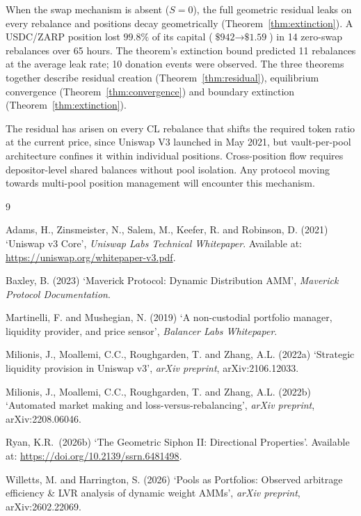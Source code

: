 \documentclass[11pt,a4paper]{article}
\begin{document}
When the swap mechanism is absent ($S = 0$), the full geometric residual leaks on every rebalance and positions decay geometrically (Theorem~\ref{thm:extinction}). A USDC/ZARP position lost $99.8\%$ of its capital ($\text{\$942} \to \text{\$1.59}$) in 14 zero-swap rebalances over 65 hours. The theorem's extinction bound predicted 11 rebalances at the average leak rate; 10 donation events were observed. The three theorems together describe residual creation (Theorem~\ref{thm:residual}), equilibrium convergence (Theorem~\ref{thm:convergence}) and boundary extinction (Theorem~\ref{thm:extinction}).

The residual has arisen on every CL rebalance that shifts the required token ratio at the current price, since Uniswap V3 launched in May 2021, but vault-per-pool architecture confines it within individual positions. Cross-position flow requires depositor-level shared balances without pool isolation. Any protocol moving towards multi-pool position management will encounter this mechanism.

\begin{thebibliography}{9}

Adams, H., Zinsmeister, N., Salem, M., Keefer, R. and Robinson, D. (2021) `Uniswap v3 Core', \emph{Uniswap Labs Technical Whitepaper}. Available at: \url{https://uniswap.org/whitepaper-v3.pdf}.

Baxley, B. (2023) `Maverick Protocol: Dynamic Distribution AMM', \emph{Maverick Protocol Documentation}.

Martinelli, F. and Mushegian, N. (2019) `A non-custodial portfolio manager, liquidity provider, and price sensor', \emph{Balancer Labs Whitepaper}.

Milionis, J., Moallemi, C.C., Roughgarden, T. and Zhang, A.L. (2022a) `Strategic liquidity provision in Uniswap v3', \emph{arXiv preprint}, arXiv:2106.12033.

Milionis, J., Moallemi, C.C., Roughgarden, T. and Zhang, A.L. (2022b) `Automated market making and loss-versus-rebalancing', \emph{arXiv preprint}, arXiv:2208.06046.

Ryan, K.R.\ (2026b) `The Geometric Siphon II: Directional Properties'. Available at: \url{https://doi.org/10.2139/ssrn.6481498}.

Willetts, M. and Harrington, S. (2026) `Pools as Portfolios: Observed arbitrage efficiency \& LVR analysis of dynamic weight AMMs', \emph{arXiv preprint}, arXiv:2602.22069.

\end{thebibliography}
\end{document}
